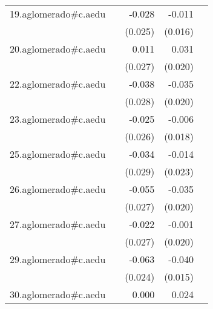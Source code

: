 {\begin{longtable}{l*{4}{D{.}{.}{-1}}}
\addlinespace
19.aglomerado#c.aedu&                     &      -0.028         &      -0.011         &                     \\
            &                     &     (0.025)         &     (0.016)         &                     \\
\addlinespace
20.aglomerado#c.aedu&                     &       0.011         &       0.031         &                     \\
            &                     &     (0.027)         &     (0.020)         &                     \\
\addlinespace
22.aglomerado#c.aedu&                     &      -0.038         &      -0.035         &                     \\
            &                     &     (0.028)         &     (0.020)         &                     \\
\addlinespace
23.aglomerado#c.aedu&                     &      -0.025         &      -0.006         &                     \\
            &                     &     (0.026)         &     (0.018)         &                     \\
\addlinespace
25.aglomerado#c.aedu&                     &      -0.034         &      -0.014         &                     \\
            &                     &     (0.029)         &     (0.023)         &                     \\
\addlinespace
26.aglomerado#c.aedu&                     &      -0.055\sym{*}  &      -0.035         &                     \\
            &                     &     (0.027)         &     (0.020)         &                     \\
\addlinespace
27.aglomerado#c.aedu&                     &      -0.022         &      -0.001         &                     \\
            &                     &     (0.027)         &     (0.020)         &                     \\
\addlinespace
29.aglomerado#c.aedu&                     &      -0.063\sym{**} &      -0.040\sym{**} &                     \\
            &                     &     (0.024)         &     (0.015)         &                     \\
\addlinespace
30.aglomerado#c.aedu&                     &       0.000         &       0.024         &                     \\

\end{longtable}}
